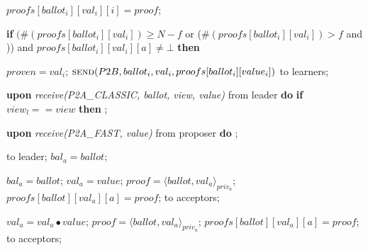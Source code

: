 \begin{algorithm}
\begin{algorithmic}[1]
		\State \hspace{\algorithmicindent} $proofs[ballot_i][val_i][i] = proof$;
		\State \hspace{\algorithmicindent} \parbox{\linewidth}{\textbf{if} $(\#(proofs[ballot_i][val_i]) \geq N-f$ or ($\#(proofs[ballot_i][val_i]) > f$ and )) and $proofs[ballot_i][val_i][a] \neq \bot$ \textbf{then}}
		\State \hspace{\algorithmicindent}\hspace{\algorithmicindent} $proven = val_i$;
		\State \hspace{\algorithmicindent}\hspace{\algorithmicindent} $\Call{send}{P2B, ballot_i, val_i, proofs[ballot_i][value_i]}$ to learners;
		
		\State
		\State \textbf{upon} \textit{receive(P2A\_CLASSIC, ballot, view, value)} from leader \textbf{do}
		\State \hspace{\algorithmicindent} \textbf{if} $view_l == view$ \textbf{then}
		\State \hspace{\algorithmicindent}\hspace{\algorithmicindent} ; 
		
		\State		
		\State \textbf{upon} \textit{receive(P2A\_FAST, value)} from proposer \textbf{do}
		\State \hspace{\algorithmicindent} ;
		
		\State
		\State {} to leader;
		\State $bal_a = ballot$;	
		\EndIf
		\EndFunction
		
		\State
		\State $bal_a = ballot$;
		\State $val_a = value$;
		\State $proof = \langle ballot, val_a \rangle_{priv_a}$;
		\State $proofs[ballot][val_a][a] = proof$;
		\State {} to acceptors;
		\EndIf
		\EndFunction
		
		\State
		\State $val_a = val_a \bullet value$;
		\State $proof = \langle ballot, val_a \rangle_{priv_a}$;
		\State $proofs[ballot][val_a][a] = proof$;
		\State {} to acceptors;
		\EndIf
		\EndFunction
	\end{algorithmic}
\end{algorithm}

